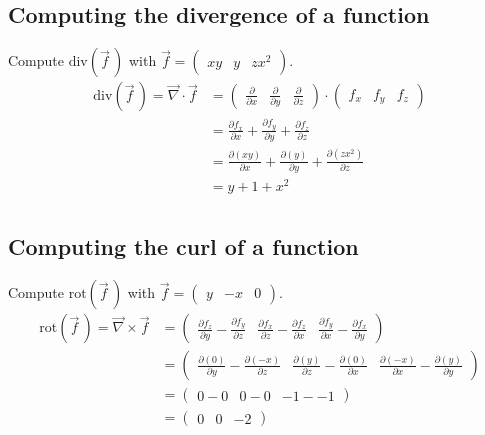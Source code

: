  \subsection{Computing the divergence of a function}
  Compute $\text{div}(\vec f \,)$ with $\vec f = \begin{pmatrix} xy & y & zx^2\end{pmatrix}$.
  \begin{align*}
    \text{div}(\vec f \,) = \vec\nabla \cdot \vec f
      & =
        \begin{pmatrix}
          \frac{\partial}{\partial x} &
          \frac{\partial}{\partial y} &
          \frac{\partial}{\partial z}
        \end{pmatrix} \cdot
        \begin{pmatrix}
          f_x & f_y & f_z
        \end{pmatrix} \\
      & =
        \frac{\partial f_x}{\partial x} +
        \frac{\partial f_y}{\partial y} +
        \frac{\partial f_z}{\partial z} \\
      & =
        \frac{\partial (xy)}{\partial x} +
        \frac{\partial (y)}{\partial y} +
        \frac{\partial (zx^2)}{\partial z} \\
      & = y + 1 + x^2 \\
  \end{align*}

  \subsection{Computing the curl of a function}
  Compute $\text{rot}(\vec f \,)$ with $\vec f = \begin{pmatrix} y & -x & 0\end{pmatrix}$.
  \begin{align*}
    \text{rot}(\vec f \,) = \vec\nabla \times \vec f
      & =
        \begin{pmatrix}
          \frac{\partial f_z}{\partial y} - \frac{\partial f_y}{\partial z} &
          \frac{\partial f_x}{\partial z} - \frac{\partial f_z}{\partial x} &
          \frac{\partial f_y}{\partial x} - \frac{\partial f_x}{\partial y}
        \end{pmatrix} \\
      & =
        \begin{pmatrix}
          \frac{\partial (0)}{\partial y} - \frac{\partial (-x)}{\partial z} &
          \frac{\partial (y)}{\partial z} - \frac{\partial (0)}{\partial x} &
          \frac{\partial (-x)}{\partial x} - \frac{\partial (y)}{\partial y}
        \end{pmatrix} \\
      & =
        \begin{pmatrix}
          0 - 0 & 0 - 0 & -1 - -1
        \end{pmatrix} \\
      & =
        \begin{pmatrix}
          0 & 0 & -2
        \end{pmatrix} \\
  \end{align*}

